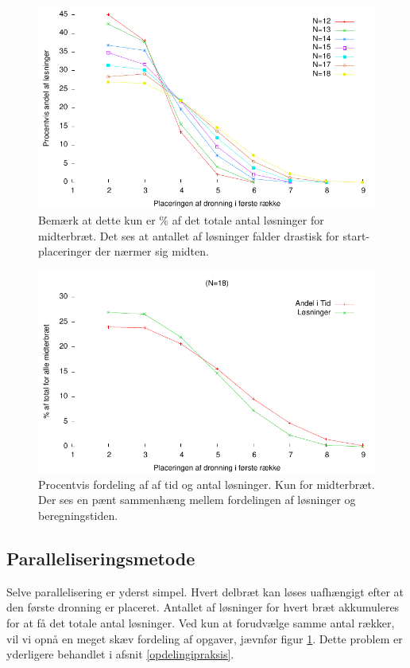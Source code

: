 \documentclass[final,a4paper,11pt]{article}
\begin{document}
\begin{figure}
\includegraphics{../benchmarks/middleandel.pdf}
\caption{Bemærk at dette kun er \% af det totale antal løsninger for midterbræt. Det ses at antallet af løsninger falder drastisk for start-placeringer der nærmer sig midten.}
\label{fig:midterandel}
\end{figure}

\begin{figure}
\includegraphics{../benchmarks/tidsandel.pdf}
\caption{Procentvis fordeling af af tid og antal løsninger. Kun for midterbræt. Der ses en pænt sammenhæng mellem fordelingen af løsninger og beregningstiden.}
\label{fig:tidsvssol}
\end{figure}

\subsection{Paralleliseringsmetode}\label{parallel}

Selve parallelisering er yderst simpel. Hvert delbræt kan løses uafhængigt efter at den første dronning er placeret. Antallet af løsninger for hvert bræt akkumuleres for at få det totale antal løsninger. Ved kun at forudvælge samme antal rækker, vil vi opnå en meget skæv fordeling af opgaver, jævnfør figur \ref{fig:midterandel}. Dette problem er yderligere behandlet i afsnit \ref{opdelingipraksis}.
\end{document}

